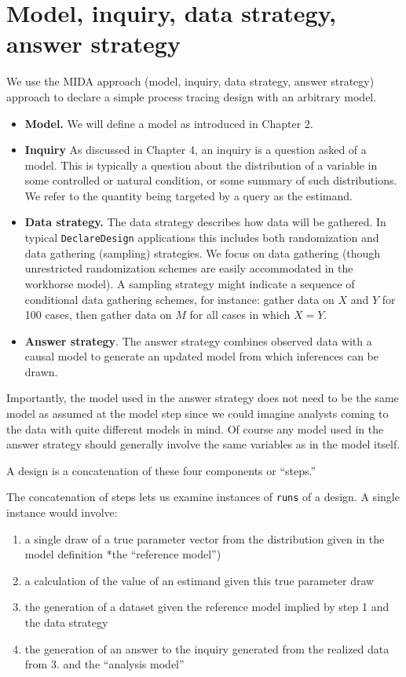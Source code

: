 \documentclass[
  12pt,
]{book}
\providecommand{\tightlist}{%
  \setlength{\itemsep}{0pt}\setlength{\parskip}{0pt}}
\begin{document}
\hypertarget{model-inquiry-data-strategy-answer-strategy}{%
\section{Model, inquiry, data strategy, answer strategy}\label{model-inquiry-data-strategy-answer-strategy}}

We use the MIDA approach (model, inquiry, data strategy, answer strategy) approach to declare a simple process tracing design with an arbitrary model.

\begin{itemize}
\item
  \textbf{Model.} We will define a model as introduced in Chapter 2.
\item
  \textbf{Inquiry} As discussed in Chapter 4, an inquiry is a question asked of a model. This is typically a question about the distribution of a variable in some controlled or natural condition, or some summary of such distributions. We refer to the quantity being targeted by a query as the estimand.
\item
  \textbf{Data strategy.} The data strategy describes how data will be gathered. In typical \texttt{DeclareDesign} applications this includes both randomization and data gathering (sampling) strategies. We focus on data gathering (though unrestricted randomization schemes are easily accommodated in the workhorse model). A sampling strategy might indicate a sequence of conditional data gathering schemes, for instance: gather data on \(X\) and \(Y\) for 100 cases, then gather data on \(M\) for all cases in which \(X=Y\).
\item
  \textbf{Answer strategy}. The answer strategy combines observed data with a causal model to generate an updated model from which inferences can be drawn.
\end{itemize}

Importantly, the model used in the answer strategy does not need to be the same model as assumed at the model step since we could imagine analysts coming to the data with quite different models in mind. Of course any model used in the answer strategy should generally involve the same variables as in the model itself.

A design is a concatenation of these four components or ``steps.''

The concatenation of steps lets us examine instances of \texttt{runs} of a design. A single instance would involve:

\begin{enumerate}
\def\labelenumi{\arabic{enumi}.}
\tightlist
\item
  a single draw of a true parameter vector from the distribution given in the model definition *the ``reference model'')
\item
  a calculation of the value of an estimand given this true parameter draw
\item
  the generation of a dataset given the reference model implied by step 1 and the data strategy
\item
  the generation of an answer to the inquiry generated from the realized data from 3. and the ``analysis model''
\end{enumerate}
\end{document}
